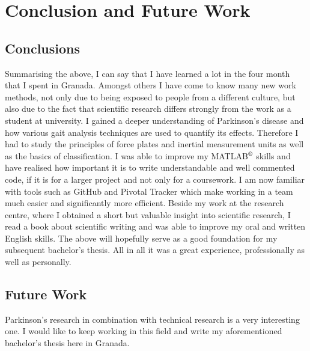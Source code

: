 \chapter{Conclusion and Future Work}
\label{ch:Conclusion and Future Work}

\section{Conclusions}

Summarising the above, I can say that I have learned a lot in the four month that I spent in Granada. Amongst others I have come to know many new work methods, not only due to being exposed to people from a different culture, but also due to the fact that scientific research differs strongly from the work as a student at university. I gained a deeper understanding of Parkinson's disease and how various gait analysis techniques are used to quantify its effects. Therefore I had to study the principles of force plates and inertial measurement units as well as the basics of classification. I was able to improve my MATLAB$\textsuperscript{\textregistered}$ skills and have realised how important it is to write understandable and well commented code, if it is for a larger project and not only for a coursework. I am now familiar with tools such as GitHub and Pivotal Tracker which make working in a team much easier and significantly more efficient.  Beside my work at the research centre, where I obtained a short but valuable insight into scientific research, I read a book about scientific writing and was able to improve my oral and written English skills. The above will hopefully serve as a good foundation for my subsequent bachelor's thesis.  All in all it was a great experience, professionally as well as personally.

\section{Future Work}

Parkinson's research in combination with technical research is a very interesting one. I would like to keep working in this field and write my aforementioned bachelor's thesis here in Granada.
